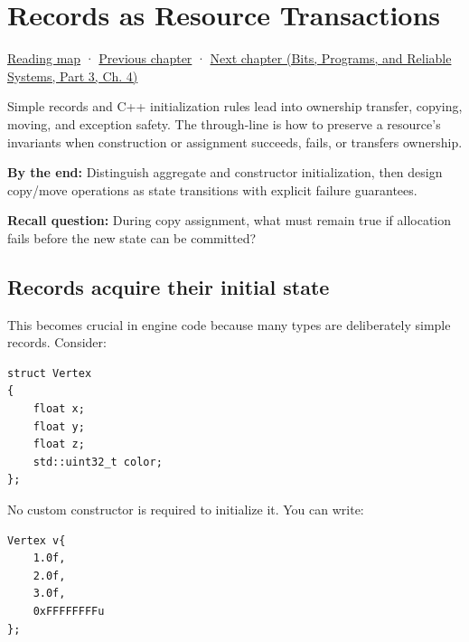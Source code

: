 \chapter{Records as Resource Transactions}\label{01-foundations-i-ch003-records-as-resource-transactions}\hypertarget{01-foundations-i-ch003}{}\label{stagechapter:01-foundations-i-ch003}

\hypertarget{01-foundations-i-ch003-records-as-resource-transactions}{}

\hyperref[volume-reading-map]{Reading map} · \hyperref[01-foundations-i-ch002-values-at-addresses-layout-lifetimes-and-representation]{Previous chapter} · \href{../01-Bits-Programs-and-Reliable-Systems-P03/main.pdf\#nameddest=01-foundations-i-ch004-prove-c-ownership-with-runnable-experiments}{Next chapter (Bits, Programs, and Reliable Systems, Part 3, Ch. 4)}

Simple records and C++ initialization rules lead into ownership transfer, copying, moving, and exception safety. The through-line is how to preserve a resource's invariants when construction or assignment succeeds, fails, or transfers ownership.

\textbf{By the end:} Distinguish aggregate and constructor initialization, then design copy/move operations as state transitions with explicit failure guarantees.

\textbf{Recall question:} During copy assignment, what must remain true if allocation fails before the new state can be committed?

\section{Records acquire their initial state}\label{01-foundations-i-ch003-records-acquire-their-initial-state}

\hypertarget{01-foundations-i-ch003-records-acquire-their-initial-state}{}

This becomes crucial in engine code because many types are deliberately simple records. Consider:

\begin{verbatim}
struct Vertex
{
    float x;
    float y;
    float z;
    std::uint32_t color;
};
\end{verbatim}

No custom constructor is required to initialize it. You can write:

\begin{verbatim}
Vertex v{
    1.0f,
    2.0f,
    3.0f,
    0xFFFFFFFFu
};
\end{verbatim}

